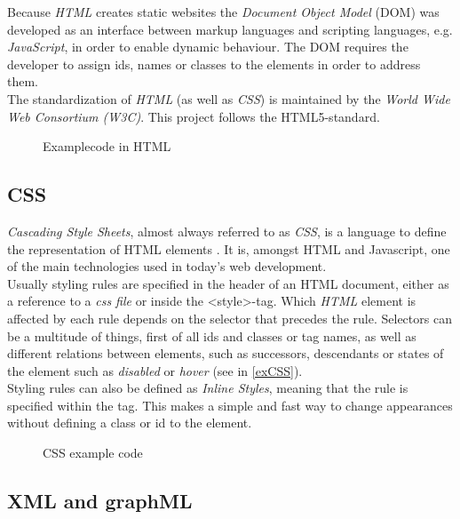 Because \textit{HTML} creates static websites the \textit{Document Object Model}  (DOM) was developed as an interface between markup languages and scripting languages, e.g. \textit{JavaScript}, in order to enable dynamic behaviour. The DOM requires the developer to assign ids, names or classes to the elements in order to address them. \\
The standardization of \textit{HTML} (as well as \textit{CSS}) is maintained by the \textit{World Wide Web Consortium (W3C)}. This project follows the HTML5-standard.

\begin{figure}[!h]

\caption{Examplecode in HTML}
\label{exHTML}
\end{figure}

\subsection{CSS}
\textit{Cascading Style Sheets},  almost always referred to as \textit{CSS}, is a language to define the representation of HTML elements \cite{hogan_2011,css-web-dokumentation}. It is, amongst HTML and Javascript, one of the main technologies used in today's web development.\\
Usually styling rules are specified in the header of an HTML document, either as a reference to a \textit{css file} or inside the \textless style\textgreater-tag. Which \textit{HTML} element is affected by each rule depends on the selector that precedes the rule. Selectors can be a multitude of things, first of all ids and classes or tag names, as well as different relations between elements, such as successors, descendants or states of the element such as \textit{disabled} or \textit{hover} (see in \autoref{exCSS}).\\
Styling rules can also be defined as \textit{Inline Styles}, meaning that the rule is specified within the tag. This makes a simple and fast way to change appearances without defining a class or id to the element.

\begin{figure}[!h]

\caption{CSS example code}
\label{exCSS}
\end{figure}

\subsection{XML and graphML}
